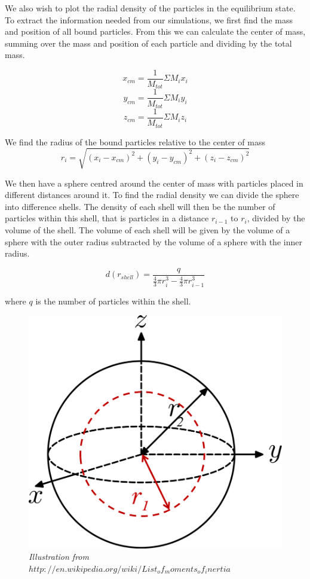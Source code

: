 \documentclass[a4paper,12pt, english]{article}
\begin{document}
We also wish to plot the radial density of the particles in the equilibrium state. To extract the information needed from our simulations, we first find the mass and position of all bound particles. From this we can calculate the center of mass, summing over the mass and position of each particle and dividing by the total mass.


$$ x_{cm} = \frac{1}{M_{tot}} \Sigma M_i x_i $$
$$ y_{cm} = \frac{1}{M_{tot}} \Sigma M_i y_i $$
$$ z_{cm} = \frac{1}{M_{tot}} \Sigma M_i z_i $$

We find the radius of the bound particles relative to the center of mass
\[
r_i = \sqrt{(x_i - x_{cm})^2 + (y_i - y_{cm})^2 + (z_i - z_{cm})^2 }
\]

We then have a sphere centred around the center of mass with particles placed in different distances around it. To find the radial density we can divide the sphere into difference shells. The density of each shell will then be the number of particles within this shell, that is particles in a distance $r_{i-1}$ to $r_i$, divided by the volume of the shell. The volume of each shell will be given by the volume of a sphere with the outer radius subtracted by the volume of a sphere with the inner radius.

\[
d(r_{shell}) = \frac{q}{ \frac{4}{3} \pi r_i^3 - \frac{4}{3} \pi r_{i-1}^3}
\]
 
where $q$ is the number of particles within the shell.

\begin{figure}
        \includegraphics[scale=0.5]{sphere.png}
        \caption{\textit{Illustration from $ http://en.wikipedia.org/wiki/List_of_moments_of_inertia$}}
        \label{fig:sphere}
\end{figure}
        
\end{document}
